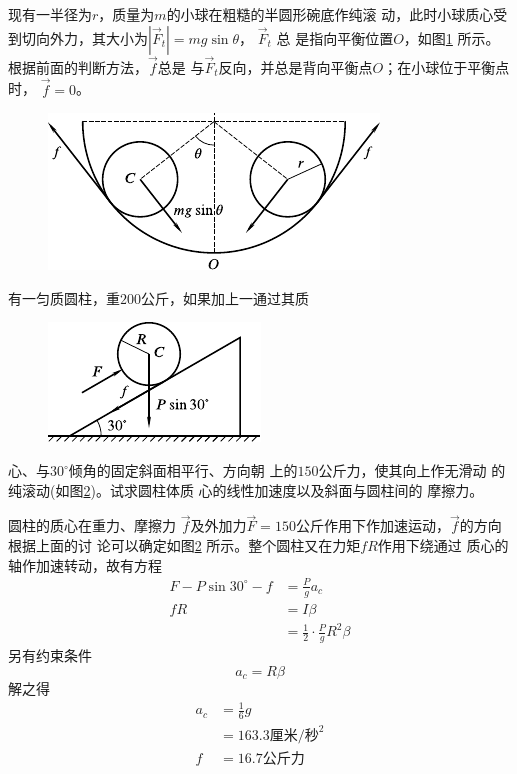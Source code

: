 现有一半径为$ r $，质量为$ m $的小球在粗糙的半圆形碗底作纯滚
动，此时小球质心受到切向外力，其大小为$ | \vec{F} _ t | = m g \sin \theta $， $ \vec{F} _ t $ 总
是指向平衡位置$ O $，如图\ref{fig:10.16} 所示。根据前面的判断方法，$\vec{f}$总是
与$ \vec{F} _ t $反向，并总是背向平衡点$ O $；在小球位于平衡点时， $ \vec{f} = 0 $。

\begin{figure}[h]
  \centering
  \includegraphics{figure/fig10.16}
  \caption{}
  \label{fig:10.16}
\end{figure}

\clearpage
\example 有一匀质圆柱，重$ 200 $公斤，如果加上一通过其质
\begin{figure}
  \centering
  \includegraphics{figure/fig10.17}
  \caption{}
  \label{fig:10.17}
\end{figure}
心、与$ 30^\circ $倾角的固定斜面相平行、方向朝
上的$ 150 $公斤力，使其向上作无滑动
的纯滚动(如图\ref{fig:10.17})。试求圆柱体质
心的线性加速度以及斜面与圆柱间的
摩擦力。

\solution 圆柱的质心在重力、摩擦力
$\vec{f}$及外加力$ \vec{F}=150 $公斤作用下作加速运动，$\vec{f}$的方向根据上面的讨
论可以确定如图\ref{fig:10.17} 所示。整个圆柱又在力矩$ fR $作用下绕通过
质心的轴作加速转动，故有方程
\begin{equation*}
  \begin{split}
    F - P \sin 3 0 ^ { \circ } - f &= \frac { P } { g } a _ { c } \\
    f R &= I \beta \\
    &= \frac { 1 } { 2 } \cdot \frac { P } { g } R ^ { 2 } \beta
  \end{split}
\end{equation*}
另有约束条件
\begin{equation*}
  a _ { c } = R \beta
\end{equation*}
解之得
\begin{equation*}
  \begin{split}
    a _ { c } &= \frac { 1 } { 6 } g \\
    &= 1 6 3 . 3 \text{厘米/秒} ^ 2 \\
    f &= 1 6 . 7 \text{公斤力}
  \end{split}
\end{equation*}

